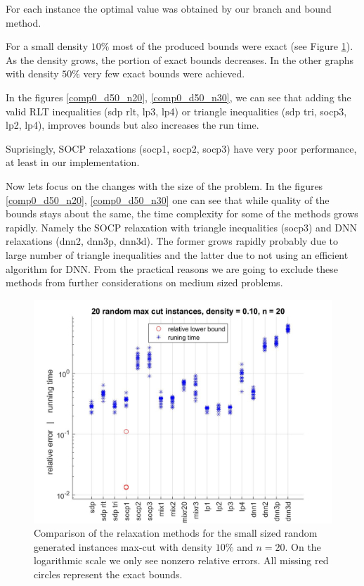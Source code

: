 \documentclass[12pt]{book}
\theoremstyle{definition}
\begin{document}
For each instance the optimal value was obtained by our branch and bound method. 

For a small density $10\%$ most of the produced bounds were exact (see Figure \ref{comp0_d10_n20}). 
As the density grows, the portion of exact bounds decreases. In the other graphs with density $50\%$ very few exact bounds were achieved.

In the figures \ref{comp0_d50_n20}, \ref{comp0_d50_n30}, we can see that adding the valid RLT inequalities (sdp rlt, lp3, lp4) or triangle inequalities (sdp tri, socp3, lp2, lp4), improves bounds but also increases the run time.

Suprisingly, SOCP relaxations (socp1, socp2, socp3) have very poor performance, at least in our implementation.


Now lets focus on the changes with the size of the problem. In the figures \ref{comp0_d50_n20}, \ref{comp0_d50_n30} one can see that while quality of the bounds stays about the same, the time complexity for some of the methods grows rapidly. Namely the SOCP relaxation with triangle inequalities (socp3) and DNN relaxations (dnn2, dnn3p, dnn3d). The former grows rapidly probably due to large number of triangle inequalities and the latter due to not using an efficient algorithm for DNN. From the practical reasons we are going to exclude these methods from further considerations on medium sized problems.

\begin{center}
\begin{figure}
\includegraphics[scale = 0.27]{img/comp0_d10_n20.jpg}
\caption[Comparison of relaxations - small, sparse instances of max-cut]{Comparison of the relaxation methods for the small sized random generated instances max-cut with density $10\%$ and $n=20$. On the logarithmic scale we only see nonzero relative errors. All missing red circles represent the exact bounds.}
\label{comp0_d10_n20}
\end{figure}
\end{center}
\end{document}
